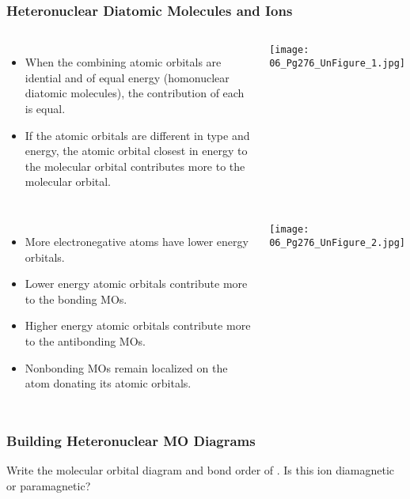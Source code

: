 \documentclass[notes=only]{beamer}
\begin{document}
\begin{frame}[c,allowframebreaks]
	\frametitle{Heteronuclear Diatomic Molecules and Ions}
	\begin{columns}
		\begin{itemize}
			\item When the combining atomic orbitals are idential and of
				equal energy (\alert{homonuclear} diatomic molecules),
				the contribution of each is equal.
			\item If the atomic orbitals are different in type and energy,
				the atomic orbital \alert{closest} in energy to the
				molecular orbital contributes more to the molecular
				orbital.
		\end{itemize}


		\begin{center}
			\texttt{[image: 06\_Pg276\_UnFigure\_1.jpg]}
		\end{center}
	\end{columns}

	\framebreak

	\begin{columns}
		\column{0.5\textwidth}
		\begin{itemize}
			\item More electronegative atoms have lower
			        energy orbitals.
			\item Lower energy atomic orbitals contribute
			        more to the \alert{bonding} MOs.
			\item Higher energy atomic orbitals contribute
			        more to the \alert{antibonding} MOs.
			\item \alert{Nonbonding} MOs remain localized on
				the atom donating its atomic orbitals.
		\end{itemize}
		\column{0.5\textwidth}
		\begin{center}
			\texttt{[image: 06\_Pg276\_UnFigure\_2.jpg]}
		\end{center}
	\end{columns}
\end{frame}

\begin{frame}[t] %
	\frametitle{Building Heteronuclear MO Diagrams}
	Write the molecular orbital diagram and bond order of . Is this ion
	diamagnetic or paramagnetic?
\end{frame}


\end{document}
